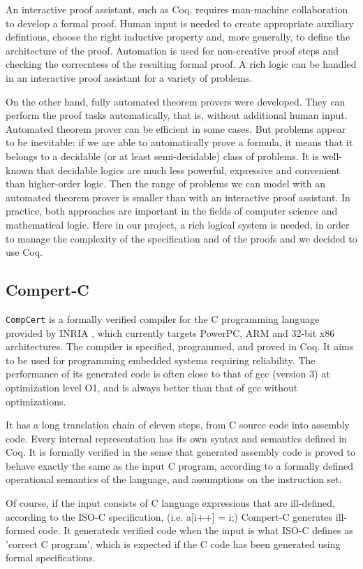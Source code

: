 \documentclass[a4paper, conference]{IEEEtran}
\newcommand{\compcert}{\texttt{CompCert}\xspace}
\newcommand{\compcert}{Compcert\xspace}
\begin{document}
An interactive proof assistant, such as Coq, requires man-machine
collaboration to develop a formal proof.  Human input is needed to
create appropriate auxiliary defintions, choose the right inductive
property and, more generally, to define the architecture of the proof.
Automation is used for non-creative proof steps and checking the
correcntess of the resulting formal proof.  A rich logic can be
handled in an interactive proof assistant for a variety of problems.

On the other hand, fully automated theorem provers were developed.
They can perform the proof tasks automatically, that is, without
additional human input.  Automated theorem prover can be efficient in
some cases.  But problems appear to be inevitable: if we are able to
automatically prove a formula, it means that it belongs to a decidable
(or at least semi-decidable) class of problems.  It is well-known that
decidable logics are much less powerful, expressive and convenient
than higher-order logic.  Then the range of problems we can model with
an automated theorem prover is smaller than with an interactive proof
assistant.  In practice, both approaches are important in the fields
of computer science and mathematical logic.  Here in our project, a
rich logical system is needed, in order to manage the complexity of
the specification and of the proofs and we decided to use Coq.

\subsection{Compert-C}
\compcert is a formally verified compiler for the C programming
language provided by INRIA \cite{ccc}, which currently targets
PowerPC, ARM and 32-bit x86 architectures.  The compiler is specified,
programmed, and proved in Coq. It aims to be used for programming
embedded systems requiring reliability. The performance of its
generated code is often close to that of gcc (version 3) at
optimization level O1, and is always better than that of gcc without
optimizations.

It has a long translation chain of eleven steps, from C source code
into assembly code. Every internal representation has its own syntax
and semantics defined in Coq. It is formally verified in the sense
that generated assembly code is proved to behave exactly the
same as the input C program, according to a formally defined
operational semantics of the language, and assumptions on the
instruction set.

Of course, if the input consists of C language expressions that are
ill-defined, according to the ISO-C specification, (i.e.  a[i++] = i;)
Compert-C generates ill-formed code. It generateds verified code when
the input is what ISO-C defines as 'correct C program', which is expected
if the C code has been generated using formal specifications.
\end{document}
